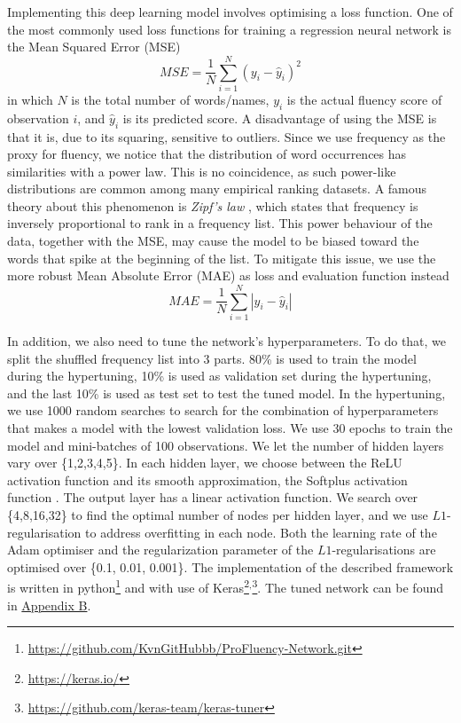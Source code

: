 \documentclass[11pt]{article}
\begin{document}
Implementing this deep learning model involves optimising a loss function. One of the most commonly used loss functions for training a regression neural network is the Mean Squared Error (MSE)
\begin{equation}
    MSE = \frac{1}{N}\sum_{i=1}^N(y_i - \hat{y}_i)^2
\end{equation}
in which $N$ is the total number of words/names, $y_i$ is the actual fluency score of observation $i$, and $\hat{y}_i$ is its predicted score. A disadvantage of using the MSE is that it is, due to its squaring, sensitive to outliers. Since we use frequency as the proxy for fluency, we notice that the distribution of word occurrences has similarities with a power law. This is no coincidence, as such power-like distributions are common among many empirical ranking datasets. A famous theory about this phenomenon is \textit{Zipf's law} \citep{zipf1932selected}, which states that frequency is inversely proportional to rank in a frequency list. This power behaviour of the data, together with the MSE, may cause the model to be biased toward the words that spike at the beginning of the list. To mitigate this issue, we use the more robust Mean Absolute Error (MAE) as loss and evaluation function instead
\begin{equation}
    MAE = \frac{1}{N}\sum_{i=1}^N|y_i - \hat{y}_i|
\end{equation}

In addition, we also need to tune the network's hyperparameters. To do that, we split the shuffled frequency list into 3 parts. 80\% is used to train the model during the hypertuning, 10\% is used as validation set during the hypertuning, and the last 10\% is used as test set to test the tuned model. In the hypertuning, we use 1000 random searches to search for the combination of hyperparameters that makes a model with the lowest validation loss.
We use 30 epochs to train the model and mini-batches of 100 observations.
We let the number of hidden layers vary over \{1,2,3,4,5\}. In each hidden layer, we choose between the ReLU activation function \citep{fukushima1975cognitron} and its smooth approximation, the Softplus activation function \citep{glorot2011deep}. The output layer has a linear activation function.
We search over \{4,8,16,32\} to find the optimal number of nodes per hidden layer, and we use $L1$-regularisation to address overfitting in each node. Both the learning rate of the Adam optimiser \citep{kingma2014adam} and the regularization parameter of the $L1$-regularisations are optimised over \{0.1, 0.01, 0.001\}. The implementation of the described framework is written in python\footnote{\url{https://github.com/KvnGitHubbb/ProFluency-Network.git}} and with use of Keras\footnote{\url{https://keras.io/}}$^,$\footnote{\url{https://github.com/keras-team/keras-tuner}}. The tuned network can be found in \hyperref[Appendix B]{Appendix B}.
\end{document}
